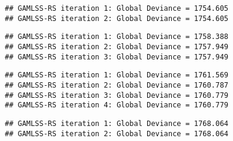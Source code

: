 \begin{verbatim}
## GAMLSS-RS iteration 1: Global Deviance = 1754.605 
## GAMLSS-RS iteration 2: Global Deviance = 1754.605
\end{verbatim}

\begin{Shaded}
\begin{Highlighting}[]
\OtherTok{\textless{}{-}} \SpecialCharTok{\textasciitilde{}} \NormalTok{, }
\end{Highlighting}
\end{Shaded}

\begin{verbatim}
## GAMLSS-RS iteration 1: Global Deviance = 1758.388 
## GAMLSS-RS iteration 2: Global Deviance = 1757.949 
## GAMLSS-RS iteration 3: Global Deviance = 1757.949
\end{verbatim}

\begin{Shaded}
\begin{Highlighting}[]
\OtherTok{\textless{}{-}} \SpecialCharTok{\textasciitilde{}} \NormalTok{, }
\end{Highlighting}
\end{Shaded}

\begin{verbatim}
## GAMLSS-RS iteration 1: Global Deviance = 1761.569 
## GAMLSS-RS iteration 2: Global Deviance = 1760.787 
## GAMLSS-RS iteration 3: Global Deviance = 1760.779 
## GAMLSS-RS iteration 4: Global Deviance = 1760.779
\end{verbatim}

\begin{Shaded}
\begin{Highlighting}[]
\OtherTok{\textless{}{-}} \SpecialCharTok{\textasciitilde{}} \NormalTok{, }
\end{Highlighting}
\end{Shaded}

\begin{verbatim}
## GAMLSS-RS iteration 1: Global Deviance = 1768.064 
## GAMLSS-RS iteration 2: Global Deviance = 1768.064
\end{verbatim}

\begin{Shaded}
\begin{Highlighting}[]
\OtherTok{\textless{}{-}} \SpecialCharTok{\textasciitilde{}} \NormalTok{, }
\end{Highlighting}
\end{Shaded}

